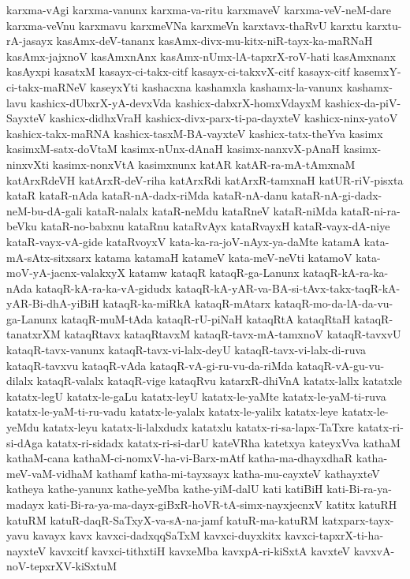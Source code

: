 {karxma-vAgi
karxma-vanunx
karxma-va-ritu
karxmaveV
karxma-veV-neM-dare
karxma-veVnu
karxmavu
karxmeVNa
karxmeVn
karxtavx-thaRvU
karxtu
karxtu-rA-jasayx
kasAmx-deV-tananx
kasAmx-divx-mu-kitx-niR-tayx-ka-maRNaH
kasAmx-jajxnoV
kasAmxnAnx
kasAmx-nUmx-lA-tapxrX-roV-hati
kasAmxnanx
kasAyxpi
kasatxM
kasayx-ci-takx-citf
kasayx-ci-takxvX-citf
kasayx-citf
kasemxY-ci-takx-maRNeV
kaseyxYti
kashacxna
kashamxla
kashamx-la-vanunx
kashamx-lavu
kashicx-dUbxrX-yA-devxVda
kashicx-dabxrX-homxVdayxM
kashicx-da-piV-SayxteV
kashicx-didhxVraH
kashicx-divx-parx-ti-pa-dayxteV
kashicx-ninx-yatoV
kashicx-takx-maRNA
kashicx-tasxM-BA-vayxteV
kashicx-tatx-theYva
kasimx
kasimxM-satx-doVtaM
kasimx-nUnx-dAnaH
kasimx-nanxvX-pAnaH
kasimx-ninxvXti
kasimx-nonxVtA
kasimxnunx
katAR
katAR-ra-mA-tAmxnaM
katArxRdeVH
katArxR-deV-riha
katArxRdi
katArxR-tamxnaH
katUR-riV-pisxta
kataR
kataR-nAda
kataR-nA-dadx-riMda
kataR-nA-danu
kataR-nA-gi-dadx-neM-bu-dA-gali
kataR-nalalx
kataR-neMdu
kataRneV
kataR-niMda
kataR-ni-ra-beVku
kataR-no-babxnu
kataRnu
kataRvAyx
kataRvayxH
kataR-vayx-dA-niye
kataR-vayx-vA-gide
kataRvoyxV
kata-ka-ra-joV-nAyx-ya-daMte
katamA
kata-mA-sAtx-sitxsarx
katama
katamaH
katameV
kata-meV-neVti
katamoV
kata-moV-yA-jacnx-valakxyX
katamw
kataqR
kataqR-ga-Lanunx
kataqR-kA-ra-ka-nAda
kataqR-kA-ra-ka-vA-gidudx
kataqR-kA-yAR-va-BA-si-tAvx-takx-taqR-kA-yAR-Bi-dhA-yiBiH
kataqR-ka-miRkA
kataqR-mAtarx
kataqR-mo-da-lA-da-vu-ga-Lanunx
kataqR-muM-tAda
kataqR-rU-piNaH
kataqRtA
kataqRtaH
kataqR-tanatxrXM
kataqRtavx
kataqRtavxM
kataqR-tavx-mA-tamxnoV
kataqR-tavxvU
kataqR-tavx-vanunx
kataqR-tavx-vi-lalx-deyU
kataqR-tavx-vi-lalx-di-ruva
kataqR-tavxvu
kataqR-vAda
kataqR-vA-gi-ru-vu-da-riMda
kataqR-vA-gu-vu-dilalx
kataqR-valalx
kataqR-vige
kataqRvu
katarxR-dhiVnA
katatx-lallx
katatxle
katatx-legU
katatx-le-gaLu
katatx-leyU
katatx-le-yaMte
katatx-le-yaM-ti-ruva
katatx-le-yaM-ti-ru-vadu
katatx-le-yalalx
katatx-le-yalilx
katatx-leye
katatx-le-yeMdu
katatx-leyu
katatx-li-lalxdudx
katatxlu
katatx-ri-sa-lapx-TaTxre
katatx-ri-si-dAga
katatx-ri-sidadx
katatx-ri-si-darU
kateVRha
katetxya
kateyxVva
kathaM
kathaM-cana
kathaM-ci-nomxV-ha-vi-Barx-mAtf
katha-ma-dhayxdhaR
katha-meV-vaM-vidhaM
kathamf
katha-mi-tayxsayx
katha-mu-cayxteV
kathayxteV
katheya
kathe-yanunx
kathe-yeMba
kathe-yiM-dalU
kati
katiBiH
kati-Bi-ra-ya-madayx
kati-Bi-ra-ya-ma-dayx-giBxR-hoVR-tA-simx-nayxjecnxV
katitx
katuRH
katuRM
katuR-daqR-SaTxyX-va-sA-na-jamf
katuR-ma-katuRM
katxparx-tayx-yavu
kavayx
kavx
kavxci-dadxqqSaTxM
kavxci-duyxkitx
kavxci-tapxrX-ti-ha-nayxteV
kavxcitf
kavxci-tithxtiH
kavxeMba
kavxpA-ri-kiSxtA
kavxteV
kavxvA-noV-tepxrXV-kiSxtuM
}
